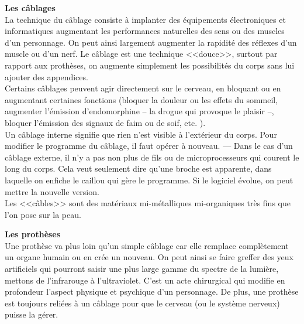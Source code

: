 \documentclass[11pt,twoside,a4paper]{article}
\begin{document}
\begin{multicols*}{2}
\textbf{Les c{\^a}blages}~\\
La technique du c{\^a}blage consiste {\`a} implanter des {\'e}quipements {\'e}lectroniques et informatiques augmentant les performances naturelles des sens ou des muscles d'un personnage. On peut ainsi largement augmenter la rapidit{\'e} des r{\'e}flexes d'un muscle ou d'un nerf. Le c{\^a}blage est une technique <<douce>>, surtout par rapport aux proth{\`e}ses, on augmente simplement les possibilit{\'e}s du corps sans lui ajouter des appendices. ~\\
Certains c{\^a}blages peuvent agir directement sur le cerveau, en bloquant ou en augmentant certaines fonctions (bloquer la douleur ou les effets du sommeil, augmenter l'{\'e}mission d'endomorphine -- la drogue qui provoque le plaisir --, bloquer l'{\'e}mission des signaux de faim ou de soif, etc. ). ~\\
Un c{\^a}blage interne signifie que rien n'est visible {\`a} l'ext{\'e}rieur du corps. Pour modifier le programme du c{\^a}blage, il faut op{\'e}rer {\`a} nouveau. --- Dans le cas d'un c{\^a}blage externe, il n'y a pas non plus de fils ou de microprocesseurs qui courent le long du corps. Cela veut seulement dire qu'une broche est apparente, dans laquelle on enfiche le caillou qui g{\`e}re le programme. Si le logiciel {\'e}volue, on peut mettre la nouvelle version. ~\\
Les <<c{\^a}bles>> sont des mat{\'e}riaux mi-m{\'e}talliques mi-organiques tr{\`e}s fins que l'on pose sur la peau. ~\\

\vfill
\columnbreak

\textbf{Les proth{\`e}ses}~\\
Une proth{\`e}se va plus loin qu'un simple c{\^a}blage car elle remplace compl{\`e}tement un organe humain ou en cr{\'e}e un nouveau. On peut ainsi se faire greffer des yeux artificiels qui pourront saisir une plus large gamme du spectre de la lumi{\`e}re, mettons de l'infrarouge {\`a} l'ultraviolet. C'est un acte chirurgical qui modifie en profondeur l'aspect physique et psychique d'un personnage. De plus, une proth{\`e}se est toujours reli{\'e}es {\`a} un c{\^a}blage pour que le cerveau (ou le syst{\`e}me nerveux) puisse la g{\'e}rer. ~\\


\end{multicols*}
\end{document}
